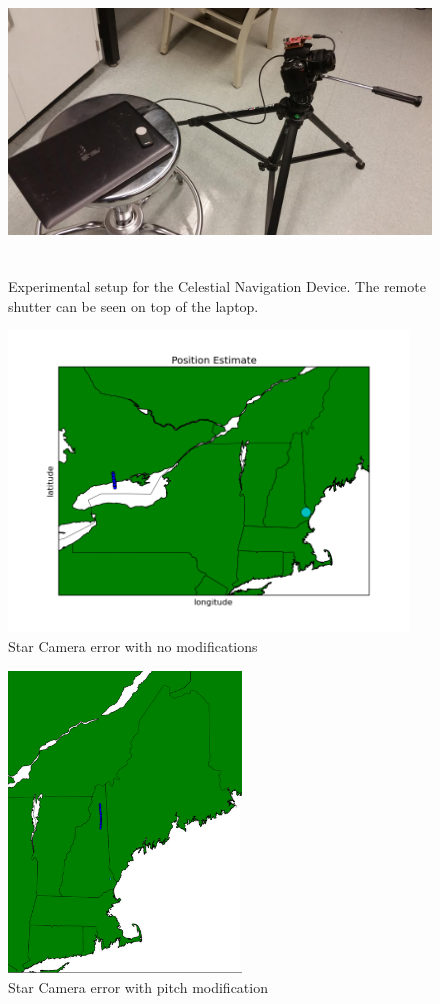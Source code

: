 \documentclass[]{aiaa-tc}%
\begin{document}
\begin{figure}[b!]%
\centering
 \includegraphics[height=8cm]{setup.png}
 \caption{Experimental setup for the Celestial Navigation Device.   The remote shutter can be seen on top of the laptop.}
 \label{f:setup}
\end{figure}
\begin{figure}[b!]
\centering
\includegraphics[height=8cm]{nomods.png}
\caption{Star Camera error with no modifications}
\label{f:nomods}
\end{figure}
\begin{figure}[b!]
\centering
\includegraphics[height=8cm]{pitchmod.png}
\caption{Star Camera error with pitch modification}
\label{f:pitchmod}
\end{figure}
\end{document}
